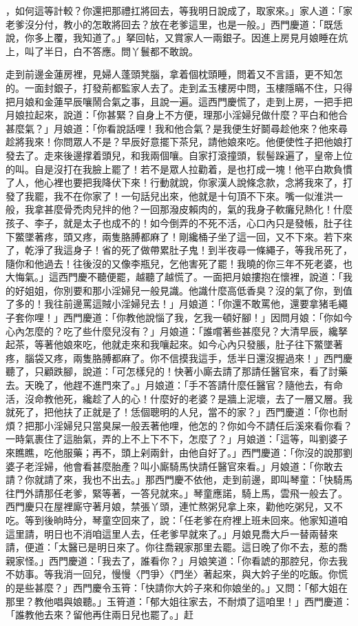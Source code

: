 ，如何這等計較？你還把那禮扛將回去，等我明日說成了，取家來。」家人道：「家老爹沒分付，教小的怎敢將回去？放在老爹這里，也是一般。」西門慶道：「既恁說，你多上覆，我知道了。」拏回帖，又賞家人一兩銀子。因進上房見月娘睡在炕上，叫了半日，白不答應。問丫鬟都不敢說。

走到前邊金蓮房裡，見婦人蓬頭凳腦，拿着個枕頭睡，問着又不言語，更不知怎的。一面封銀子，打發荊都監家人去了。走到孟玉樓房中問，玉樓隱瞞不住，只得把月娘和金蓮早辰嚷鬧合氣之事，且說一遍。這西門慶慌了，走到上房，一把手把月娘拉起來，說道：「你甚緊？自身上不方便，理那小淫婦兒做什麼？平白和他合甚麼氣？」月娘道：「你看說話哩！我和他合氣？是我便生好鬬尋趁他來？他來尋趁將我來！你問眾人不是？早辰好意擺下茶兒，請他娘來吃。他便使性子把他娘打發去了。走來後邊撑着頭兒，和我兩個嚷。自家打滾撞頭，䯼髻跺遍了，皇帝上位的叫。自是沒打在我臉上罷了！若不是眾人拉勸着，是也打成一塊！他平白欺負慣了人，他心裡也要把我降伏下來！行動就說，你家漢人說條念款，念將我來了，打發了我罷，我不在你家了！一句話兒出來，他就是十句頂不下來。嘴一似淮洪一般，我拿甚麼骨禿肉兒拌的他？一回那潑皮賴肉的，氣的我身子軟癱兒熱化！什麼孩子、李子，就是太子也成不的！如今倒弄的不死不活，心口內只是發帳，肚子往下鱉墜著疼，頭又疼，兩隻胳膊都麻了！剛纔桶子坐了這一回，又不下來。若下來了，乾淨了我這身子！省的死了做帶累肚子鬼！到半夜尋一條繩子，等我吊死了，隨你和他過去！往後沒的又像李瓶兒，乞他害死了罷！我曉的你三年不死老婆，也大悔氣。」這西門慶不聽便罷，越聽了越慌了。一面把月娘摟抱在懷裡，說道：「我的好姐姐，你別要和那小淫婦兒一般見識。他識什麼高低香臭？沒的氣了你，到值了多的！我往前邊罵這賊小淫婦兒去！」月娘道：「你還不敢罵他，還要拿猪毛繩子套你哩！」西門慶道：「你教他說惱了我，乞我一頓好腳！」因問月娘：「你如今心內怎麼的？吃了些什麼兒沒有？」月娘道：「誰嚐著些甚麼兒？大清早辰，纔拏起茶，等著他娘來吃，他就走來和我嚷起來。如今心內只發脹，肚子往下鱉墜著疼，腦袋又疼，兩隻胳膊都麻了。你不信摸我這手，恁半日還沒握過來！」西門慶聽了，只顧跌腳，說道：「可怎樣兒的！快著小廝去請了那請任醫官來，看了討藥去。天晚了，他趕不進門來了。」月娘道：「手不答請什麼任醫官？隨他去，有命活，沒命教他死，纔趁了人的心！什麼好的老婆？是牆上泥壞，去了一層又層。我就死了，把他扶了正就是了！恁個聰明的人兒，當不的家？」西門慶道：「你也耐煩？把那小淫婦兒只當臭屎一般丟著他哩，他怎的？你如今不請任后溪來看你看？一時氣裹住了這胎氣，弄的上不上下不下，怎麼了？」月娘道：「這等，叫劉婆子來瞧瞧，吃他服藥；再不，頭上剁兩針，由他自好了。」西門慶道：「你沒的說那劉婆子老淫婦，他會看甚麼胎產？叫小廝騎馬快請任醫官來看。」月娘道：「你敢去請？你就請了來，我也不出去。」那西門慶不依他，走到前邊，即叫琴童：「快騎馬往門外請那任老爹，緊等著，一答兒就來。」琴童應諾，騎上馬，雲飛一般去了。西門慶只在屋裡廝守著月娘，禁張丫頭，連忙熬粥兒拿上來，勸他吃粥兒，又不吃。等到後晌時分，琴童空回來了，說：「任老爹在府裡上班未回來。他家知道咱這里請，明日也不消咱這里人去，任老爹早就來了。」月娘見喬大戶一替兩替來請，便道：「太醫已是明日來了。你往喬親家那里去罷。這日晚了你不去，惹的喬親家怪。」西門慶道：「我去了，誰看你？」月娘笑道：「你看諕的那腔兒，你去我不妨事。等我消一回兒，慢慢〈門爭〉〈門坐〉著起來，與大妗子坐的吃飯。你慌的是些甚麼？」西門慶令玉筲：「快請你大妗子來和你娘坐的。」又問：「郁大姐在那里？教他唱與娘聽。」玉筲道：「郁大姐往家去，不耐煩了這咱里！」西門慶道：「誰教他去來？留他再住兩日兒也罷了。」赶